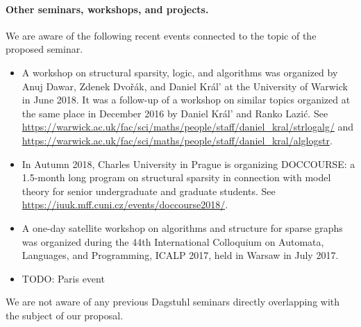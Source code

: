 \paragraph*{Other seminars, workshops, and projects.}
We are aware of the following recent events connected to the topic of the proposed seminar.
\begin{itemize}
\item A workshop on structural sparsity, logic, and algorithms was organized by Anuj Dawar, Zdenek Dvo\v{r}\'ak, and Daniel Kr\'al' at the University of Warwick in June 2018. 
It was a follow-up of a workshop on similar topics organized at the same place in December 2016 by Daniel Kr\'al' and Ranko Lazi\'c. See \url{https://warwick.ac.uk/fac/sci/maths/people/staff/daniel_kral/strlogalg/}
and \url{https://warwick.ac.uk/fac/sci/maths/people/staff/daniel_kral/alglogstr}.
\item In Autumn 2018, Charles University in Prague is organizing DOCCOURSE: a 1.5-month long program on structural sparsity in connection with model theory
for senior undergraduate and graduate students. See \url{https://iuuk.mff.cuni.cz/events/doccourse2018/}.
\item A one-day satellite workshop on algorithms and structure for sparse graphs was organized during the 44th International Colloquium on Automata, Languages, and Programming, ICALP 2017, held in Warsaw in July 2017.
\item TODO: Paris event
\end{itemize}
We are not aware of any previous Dagstuhl seminars directly overlapping with the subject of our proposal.